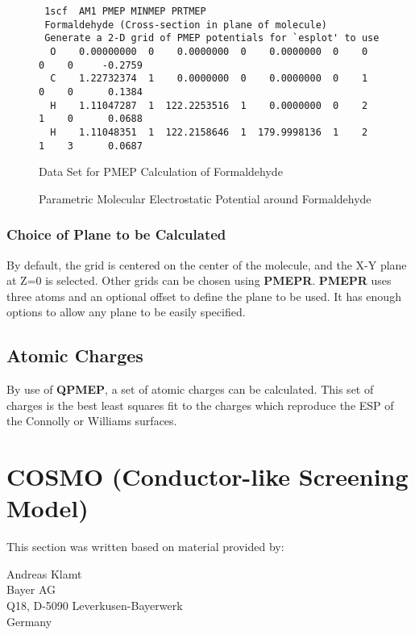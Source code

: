 \begin{figure}[hbt]
\caption{\label{pmepdata}Data Set for PMEP Calculation of Formaldehyde}
\vspace*{0.3in}
\begin{verbatim}
 1scf  AM1 PMEP MINMEP PRTMEP
 Formaldehyde (Cross-section in plane of molecule)
 Generate a 2-D grid of PMEP potentials for `esplot' to use
  O    0.00000000  0    0.0000000  0    0.0000000  0    0    0    0     -0.2759
  C    1.22732374  1    0.0000000  0    0.0000000  0    1    0    0      0.1384
  H    1.11047287  1  122.2253516  1    0.0000000  0    2    1    0      0.0688
  H    1.11048351  1  122.2158646  1  179.9998136  1    2    1    3      0.0687
\end{verbatim}
\end{figure}
\begin{figure}[hbt]
\caption{\label{pmepplot}Parametric Molecular Electrostatic Potential around Formaldehyde}

\vspace{3.1in}

\hspace*{ 0.5in} 

\vspace{0.0in}
\end{figure}



\subsubsection{Choice of Plane to be Calculated}
By default, the grid is centered on the center of the molecule, and the
X-Y plane at Z=0 is selected.  Other grids can be chosen using {\bf PMEPR}.
{\bf PMEPR} uses three atoms and an optional offset to define the plane to be
used.  It has enough options to allow any plane to be easily specified.

\subsection{Atomic Charges}

By use of {\bf QPMEP}, a set of atomic charges can be calculated.  This set
of charges is the best least squares fit to the charges which reproduce the
ESP of the Connolly or Williams surfaces.


\section{COSMO (Conductor-like Screening Model)}
This section was written based on material provided by:
\begin{center} Andreas Klamt\\
Bayer AG\\
Q18, D-5090 Leverkusen-Bayerwerk\\
Germany
\end{center}

